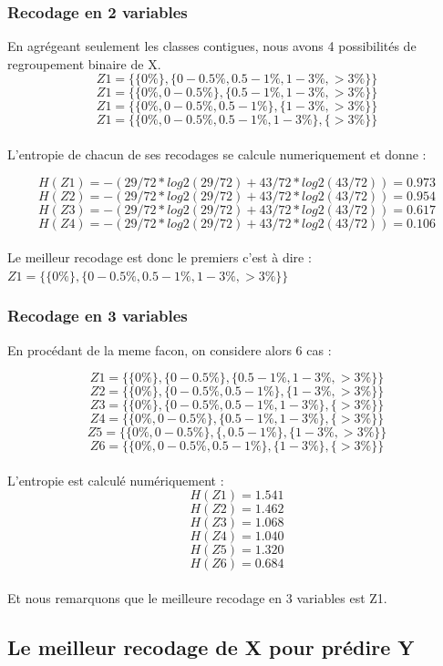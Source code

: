 \documentclass{article}
\begin{document}
\subsubsection{Recodage en 2 variables}

En agrégeant seulement les classes contigues, nous avons 4 possibilités de regroupement binaire de 
X.
\\

\[
Z1 =\{ \{0 \% \} , \{0 - 0.5 \% ,0.5-1 \% ,1-3 \% ,>3 \% \} \}  
\]
\[
Z1 =\{ \{0 \% , 0 - 0.5 \%  \} , \{0.5-1 \% ,1-3 \% ,>3 \% \} \}
\]
\[
Z1 =\{ \{0 \%, 0 - 0.5 \% ,0.5-1 \%  \} , \{1-3 \% ,>3 \% \} \}
\]
\[
Z1 =\{ \{0 \% , 0 - 0.5 \% ,0.5-1 \% ,1-3 \% \} , \{>3 \% \} \}
\]
\\

L'entropie de chacun de ses recodages se calcule numeriquement et donne :

\[
H(Z1) = -(29/72*log2(29/72)+43/72*log2(43/72)) = 0.973
\]
\[
H(Z2) = -(29/72*log2(29/72)+43/72*log2(43/72)) = 0.954
\]
\[
H(Z3) = -(29/72*log2(29/72)+43/72*log2(43/72)) = 0.617
\]
\[
H(Z4) = -(29/72*log2(29/72)+43/72*log2(43/72)) = 0.106
\]
\\
Le meilleur recodage est donc le premiers c'est à dire :
$Z1 =\{ \{0 \% \} , \{0 - 0.5 \% ,0.5-1 \% ,1-3 \% ,>3 \% \} \}$


\subsubsection{Recodage en 3 variables}

En procédant de la meme facon, on considere alors 6 cas :

\[
Z1 =\{ \{0 \% \} , \{0 - 0.5 \%\} ,\{0.5-1 \% ,1-3 \% ,>3 \% \} \}  
\]
\[
  Z2 =\{ \{0 \% \} , \{0 - 0.5\%, 0.5-1 \% \} ,\{1-3 \% ,>3 \% \} \}
\]
\[
  Z3 =\{ \{0 \% \} , \{0 - 0.5\%, 0.5-1 \% ,1-3 \%  \} ,\{>3 \% \} \}
\]
\[
  Z4 =\{ \{0 \%, 0 - 0.5\%\} , \{ 0.5-1 \% ,1-3 \%  \} ,\{>3 \% \} \}
\]
\[
  Z5 =\{ \{0 \%, 0 - 0.5\%\} , \{,  0.5-1 \% \} ,\{1-3 \% , >3 \% \} \}
\]
\[
  Z6 =\{ \{0 \%, 0 - 0.5\%,  0.5-1 \% \} , \{1-3 \%  \} ,\{>3 \% \} \}
\]
\\
L'entropie est calculé numériquement :
\[
H(Z1) = 1.541
\]
\[
H(Z2) = 1.462
\]
\[
H(Z3) = 1.068
\]
\[
H(Z4) = 1.040
\]
\[
H(Z5) = 1.320
\]
\[
H(Z6) = 0.684
\]
\\

Et nous remarquons que le meilleure recodage en 3 variables est Z1.

\subsection{Le meilleur recodage de X pour prédire Y }
\end{document}
